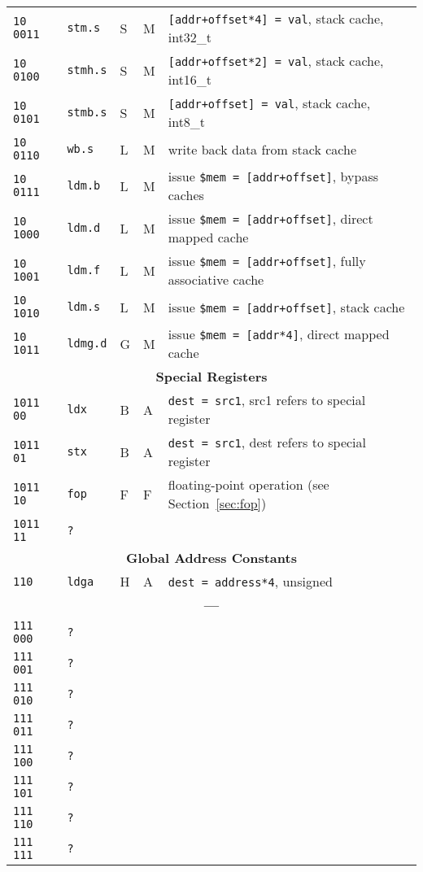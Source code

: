 \documentclass[10pt,a4paper]{article}
\begin{document}
\begin{longtable}{llllp{}}
\texttt{10 0011} & \texttt{stm.s} & S & M & \texttt{[addr+offset*4] = val}, stack cache, int32\_t \\
\texttt{10 0100} & \texttt{stmh.s} & S & M & \texttt{[addr+offset*2] = val}, stack cache, int16\_t \\
\texttt{10 0101} & \texttt{stmb.s} & S & M & \texttt{[addr+offset] = val}, stack cache, int8\_t \\
\texttt{10 0110} & \texttt{wb.s} & L & M & write back data from stack cache \\
\texttt{10 0111} & \texttt{ldm.b} & L & M & issue \texttt{\$mem = [addr+offset]}, bypass caches \\
\texttt{10 1000} & \texttt{ldm.d} & L & M & issue \texttt{\$mem = [addr+offset]}, direct mapped cache \\
\texttt{10 1001} & \texttt{ldm.f} & L & M & issue \texttt{\$mem = [addr+offset]}, fully associative cache \\
\texttt{10 1010} & \texttt{ldm.s} & L & M & issue \texttt{\$mem = [addr+offset]}, stack cache \\
\texttt{10 1011} & \texttt{ldmg.d} & G & M & issue \texttt{\$mem = [addr*4]}, direct mapped cache\\
\midrule
\multicolumn{5}{c}{\textbf{Special Registers}} \\
\cmidrule{1-5}
\texttt{1011 00} & \texttt{ldx} & B & A & \texttt{dest = src1}, src1 refers to special register \\
\texttt{1011 01} & \texttt{stx} & B & A & \texttt{dest = src1}, dest refers to special register \\
\texttt{1011 10} & \texttt{fop} & F & F & floating-point operation (see Section~\ref{sec:fop}) \\
\texttt{1011 11} & \texttt{?} & & & \\
\midrule
\multicolumn{5}{c}{\textbf{Global Address Constants}} \\
\cmidrule{1-5}
\texttt{110} & \texttt{ldga} & H & A & \texttt{dest = address*4}, unsigned \\
\midrule
\multicolumn{5}{c}{\textbf{---}} \\
\cmidrule{1-5}
\texttt{111 000} & \texttt{?} & & & \\
\texttt{111 001} & \texttt{?} & & & \\
\texttt{111 010} & \texttt{?} & & & \\
\texttt{111 011} & \texttt{?} & & & \\
\texttt{111 100} & \texttt{?} & & & \\
\texttt{111 101} & \texttt{?} & & & \\
\texttt{111 110} & \texttt{?} & & & \\
\texttt{111 111} & \texttt{?} & & & \\
\bottomrule
\end{longtable}  
\end{document}
